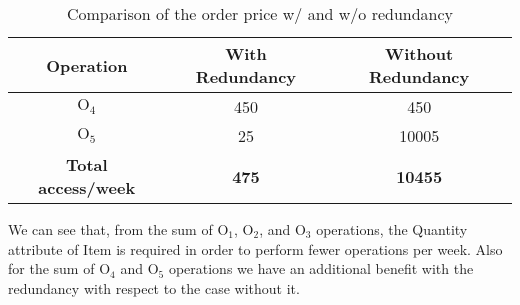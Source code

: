 \begin{table}[!h]\caption{ Comparison of the order price w/ and w/o redundancy }
	\begin{center}
		\begin{tabular}{ | c | c | c | }
			\hline
			\textbf{Operation} & \textbf{With Redundancy} & \textbf{Without Redundancy} \\ \hline
			$ \textrm{O}_\textrm{4} $ & 450 & 450\\ \hline
			$ \textrm{O}_\textrm{5} $ & 25 & 10005 \\ \hline
			\textbf{Total access/week } & 	\textbf{475} &	\textbf{10455} \\\hline
		\end{tabular}
	\end{center}
\end{table}
\newpage
We can see that, from the sum of $ \textrm{O}_\textrm{1}$, $ \textrm{O}_\textrm{2}$, and $ \textrm{O}_\textrm{3}$ operations, the Quantity attribute of Item is required in order to perform fewer operations per week. Also for the sum of $ \textrm{O}_\textrm{4}$ and $ \textrm{O}_\textrm{5}$ operations we have an additional benefit with the redundancy with respect to the case without it.